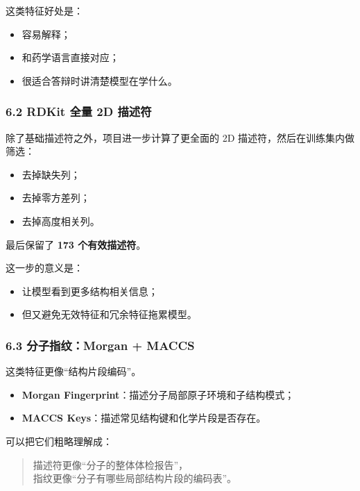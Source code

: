 \documentclass[
  ,
]{ctexart}
\providecommand{\tightlist}{%
  \setlength{\itemsep}{0pt}\setlength{\parskip}{0pt}}
\begin{document}
这类特征好处是：

\begin{itemize}
\tightlist
\item
  容易解释；
\item
  和药学语言直接对应；
\item
  很适合答辩时讲清楚模型在学什么。
\end{itemize}

\hypertarget{rdkit-ux5168ux91cf-2d-ux63cfux8ff0ux7b26}{%
\subsubsection{6.2 RDKit 全量 2D
描述符}\label{rdkit-ux5168ux91cf-2d-ux63cfux8ff0ux7b26}}

除了基础描述符之外，项目进一步计算了更全面的 2D
描述符，然后在训练集内做筛选：

\begin{itemize}
\tightlist
\item
  去掉缺失列；
\item
  去掉零方差列；
\item
  去掉高度相关列。
\end{itemize}

最后保留了 \textbf{173 个有效描述符}。

这一步的意义是：

\begin{itemize}
\tightlist
\item
  让模型看到更多结构相关信息；
\item
  但又避免无效特征和冗余特征拖累模型。
\end{itemize}

\hypertarget{ux5206ux5b50ux6307ux7eb9morgan-maccs}{%
\subsubsection{6.3 分子指纹：Morgan +
MACCS}\label{ux5206ux5b50ux6307ux7eb9morgan-maccs}}

这类特征更像``结构片段编码''。

\begin{itemize}
\tightlist
\item
  \textbf{Morgan Fingerprint}：描述分子局部原子环境和子结构模式；
\item
  \textbf{MACCS Keys}：描述常见结构键和化学片段是否存在。
\end{itemize}

可以把它们粗略理解成：

\begin{quote}
描述符更像``分子的整体体检报告''，\\
指纹更像``分子有哪些局部结构片段的编码表''。
\end{quote}
\end{document}
